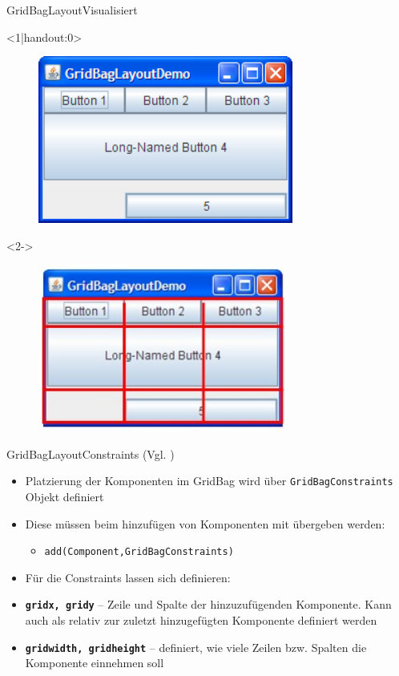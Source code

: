 \begin{frame}{GridBagLayout}{Visualisiert}
    \begin{onlyenv}<1|handout:0>
    \begin{figure}
        \includegraphics[height=5.5cm]{graph/gridbag}
        \caption*{\cite{orac:gridbaglayout}}
    \end{figure}
    \end{onlyenv}
    \begin{onlyenv}<2->
    \begin{figure}
        \includegraphics[height=5.5cm]{graph/gridbagline}
        \caption*{\cite{orac:gridbaglayout}}
    \end{figure}
    \end{onlyenv}
\end{frame}

\begin{frame}{GridBagLayout}{Constraints (Vgl. \cite{orac:gridbaglayout})}
    \begin{itemize}
        \item Platzierung der Komponenten im GridBag wird über \texttt{GridBagConstraints} Objekt definiert
        \item Diese müssen beim hinzufügen von Komponenten mit übergeben werden:
        \begin{itemize}
            \item \texttt{add(Component,GridBagConstraints)}
        \end{itemize}
        \item Für die Constraints lassen sich definieren:
        \item \textbf{\texttt{gridx, gridy}} -- Zeile und Spalte der hinzuzufügenden Komponente. Kann auch als relativ zur zuletzt hinzugefügten Komponente definiert werden
        \item \textbf{\texttt{gridwidth, gridheight}} -- definiert, wie viele Zeilen bzw. Spalten die Komponente einnehmen soll
    \end{itemize}
\end{frame}

